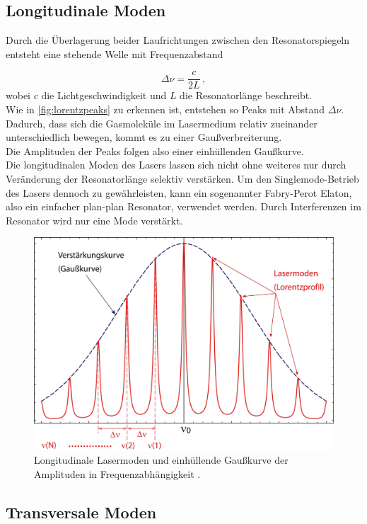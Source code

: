 \subsection{Longitudinale Moden}

Durch die Überlagerung beider Laufrichtungen zwischen den Resonatorspiegeln entsteht eine stehende Welle mit Frequenzabstand

\begin{equation}
    \Delta \nu = \frac{c}{2L} \,,
    \label{eq:freqdist}
\end{equation}
wobei $c$ die Lichtgeschwindigkeit und $L$ die Resonatorlänge beschreibt. \\
Wie in \autoref{fig:lorentzpeaks} zu erkennen ist, entstehen so Peaks mit Abstand $\Delta \nu$.
Dadurch, dass sich die Gasmoleküle im Lasermedium relativ zueinander unterschiedlich bewegen, kommt es zu einer Gaußverbreiterung. \\
Die Amplituden der Peaks folgen also einer einhüllenden Gaußkurve. \\
Die longitudinalen Moden des Lasers lassen sich nicht ohne weiteres nur durch Veränderung der Resonatorlänge selektiv verstärken.
Um den Singlemode-Betrieb des Lasers dennoch zu gewährleisten, kann ein sogenannter Fabry-Perot Elaton, also ein einfacher plan-plan Resonator, verwendet werden. 
Durch Interferenzen im Resonator wird nur eine Mode verstärkt.

\begin{figure}[H]
    \centering
    \includegraphics[width=.8\textwidth]{figures/LaserModes.pdf}
    \caption{Longitudinale Lasermoden und einhüllende Gaußkurve der Amplituden in Frequenzabhängigkeit \cite{wikilongmode}.}
    \label{fig:lorentzpeaks}
\end{figure}

\subsection{Transversale Moden}

